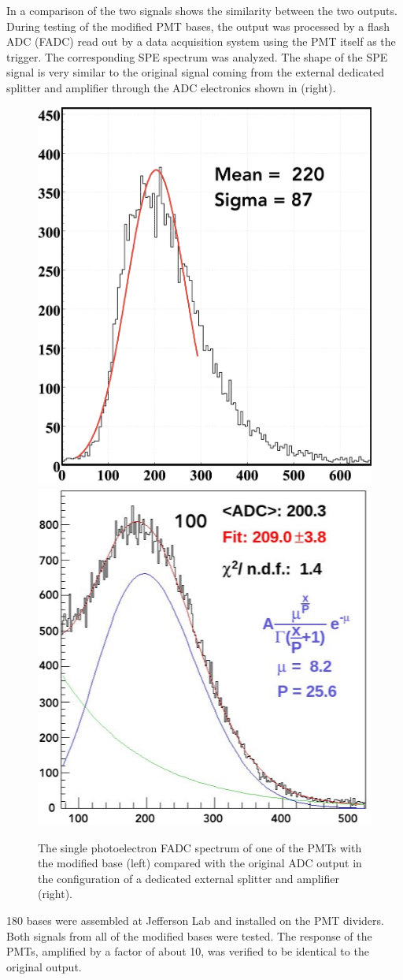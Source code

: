 In  a comparison of the two signals shows the similarity between the two outputs. During testing of
the modified PMT bases, the output was processed by a flash ADC (FADC) read out by a data acquisition system using
the PMT itself as the trigger. The corresponding SPE spectrum was analyzed. The shape of the SPE signal is very
similar to the original signal coming from the external dedicated splitter and amplifier through the ADC electronics
shown in  (right).

\begin{figure}[H]
	\centering
	\includegraphics[width=0.47\columnwidth,height=0.7\columnwidth]{img/fadcOutput.png}
	\includegraphics[width=0.47\columnwidth,height=0.7\columnwidth]{img/cc_signal.png}
	\caption{The single photoelectron FADC spectrum of one of the PMTs with the modified base (left) compared with
          the original ADC output in the configuration of a dedicated external splitter and amplifier (right). }
	\label{fig:dividerTests}
\end{figure}

180 bases were assembled at Jefferson Lab and installed on the PMT dividers. Both signals from all of the modified
bases were tested. The response of the PMTs, amplified by a factor of about 10, was verified to be identical to the original
output.
